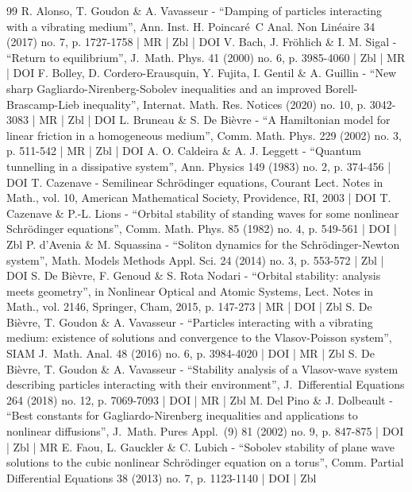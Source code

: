 \begin{thebibliography}{99}
R. Alonso, T. Goudon \& A. Vavasseur - “Damping of particles interacting with a vibrating medium”, Ann. Inst. H. Poincaré C Anal. Non Linéaire 34 (2017) no. 7, p. 1727-1758 | MR | Zbl | DOI
V. Bach, J. Fröhlich \& I. M. Sigal - “Return to equilibrium”, J. Math. Phys. 41 (2000) no. 6, p. 3985-4060 | Zbl | MR | DOI
F. Bolley, D. Cordero-Erausquin, Y. Fujita, I. Gentil \& A. Guillin - “New sharp Gagliardo-Nirenberg-Sobolev inequalities and an improved Borell-Brascamp-Lieb inequality”, Internat. Math. Res. Notices (2020) no. 10, p. 3042-3083 | MR | Zbl | DOI
L. Bruneau \& S. De Bièvre - “A Hamiltonian model for linear friction in a homogeneous medium”, Comm. Math. Phys. 229 (2002) no. 3, p. 511-542 | MR | Zbl | DOI
A. O. Caldeira \& A. J. Leggett - “Quantum tunnelling in a dissipative system”, Ann. Physics 149 (1983) no. 2, p. 374-456 | DOI
T. Cazenave - Semilinear Schrödinger equations, Courant Lect. Notes in Math., vol. 10, American Mathematical Society, Providence, RI, 2003 | DOI
T. Cazenave \& P.-L. Lions - “Orbital stability of standing waves for some nonlinear Schrödinger equations”, Comm. Math. Phys. 85 (1982) no. 4, p. 549-561 | DOI | Zbl
P. d’Avenia \& M. Squassina - “Soliton dynamics for the Schrödinger-Newton system”, Math. Models Methods Appl. Sci. 24 (2014) no. 3, p. 553-572 | Zbl | DOI
S. De Bièvre, F. Genoud \& S. Rota Nodari - “Orbital stability: analysis meets geometry”, in Nonlinear Optical and Atomic Systems, Lect. Notes in Math., vol. 2146, Springer, Cham, 2015, p. 147-273 | MR | DOI | Zbl
S. De Bièvre, T. Goudon \& A. Vavasseur - “Particles interacting with a vibrating medium: existence of solutions and convergence to the Vlasov-Poisson system”, SIAM J. Math. Anal. 48 (2016) no. 6, p. 3984-4020 | DOI | MR | Zbl
S. De Bièvre, T. Goudon \& A. Vavasseur - “Stability analysis of a Vlasov-wave system describing particles interacting with their environment”, J. Differential Equations 264 (2018) no. 12, p. 7069-7093 | DOI | MR | Zbl
M. Del Pino \& J. Dolbeault - “Best constants for Gagliardo-Nirenberg inequalities and applications to nonlinear diffusions”, J. Math. Pures Appl. (9) 81 (2002) no. 9, p. 847-875 | DOI | Zbl | MR
E. Faou, L. Gauckler \& C. Lubich - “Sobolev stability of plane wave solutions to the cubic nonlinear Schrödinger equation on a torus”, Comm. Partial Differential Equations 38 (2013) no. 7, p. 1123-1140 | DOI | Zbl

\end{thebibliography}
